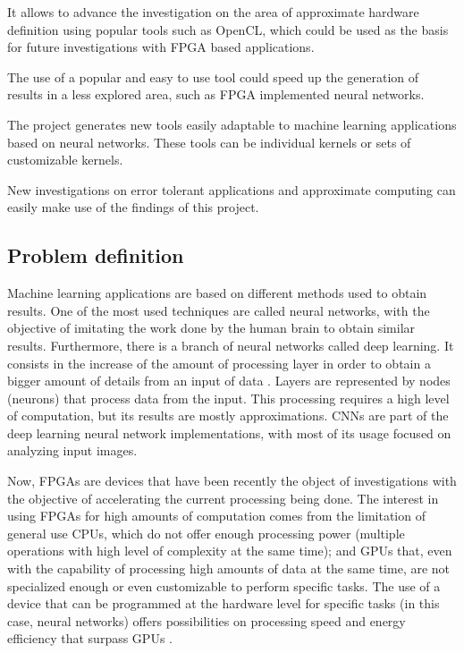 \begin{compactitem}
    \item It allows to advance the investigation on the area of approximate hardware definition
    using popular tools such as OpenCL, which could be used as the basis for future investigations
    with FPGA based applications.
    \item The use of a popular and easy to use tool could speed up the generation of results in a
    less explored area, such as FPGA implemented neural networks.
    \item The project generates new tools easily adaptable to machine learning applications based
    on neural networks. These tools can be individual kernels or sets of customizable kernels. 
    \item New investigations on error tolerant applications and approximate computing can easily 
    make use of the findings of this project.
\end{compactitem}


\subsection{Problem definition}

Machine learning applications are based on different methods used to obtain results.
One of the most used techniques are called neural networks, with the objective of imitating the work
done by the human brain to obtain similar results. Furthermore, there is a branch of neural networks
called deep learning. It consists in the increase of the amount of processing layer in order to obtain
a bigger amount of details from an input of data \cite{deeplearningoverview}. Layers are represented by nodes (neurons)
that process data from the input. This processing requires a high level of computation, but its
results are mostly approximations. CNNs are part of the deep learning neural network implementations, with most
of its usage focused on analyzing input images.

Now, FPGAs are devices that have been recently the object of investigations with the objective of accelerating
the current processing being done. The interest in using FPGAs for high amounts of computation comes from
the limitation of general use CPUs, which do not offer enough processing power (multiple operations with 
high level of complexity at the same time); and GPUs that, even with the capability of processing high
amounts of data at the same time, are not specialized enough or even customizable to perform specific tasks.
The use of a device that can be programmed at the hardware level for specific tasks (in this case, neural networks)
offers possibilities on processing speed and energy efficiency that surpass GPUs \cite{surveyfpgann}.

